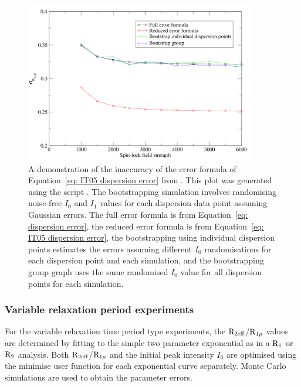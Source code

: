 \begin{figure}[h]
\label{fig: dispersion error comparison}
\centerline{\includegraphics[width=0.9\textwidth, bb=14 14 728 512]{graphics/analyses/dispersion/error_comparison}}
\caption[Comparison of relaxation dispersion errors]{A demonstration of the inaccuracy of the error formula of Equation~\ref{eq: IT05 dispersion error} from \citet{IshimaTorchia05}.  This plot was generated using the script .  The bootstrapping simulation involves randomising noise-free $I_0$ and $I_1$ values for each dispersion data point assuming Gaussian errors.  The full error formula is from Equation~\ref{eq: dispersion error}, the reduced error formula is from Equation~\ref{eq: IT05 dispersion error}, the bootstrapping using individual dispersion points estimates the errors assuming different $I_0$ randomisations for each dispersion point and each simulation, and the bootstrapping group graph uses the same randomised $I_0$ value for all dispersion points for each simulation.}
\end{figure}


\subsubsection{Variable relaxation period experiments}

For the variable relaxation time period type experiments, the $\mathrm{R}_{2\textrm{eff}}$/$\mathrm{R}_{1\rho}$ values are determined by fitting to the simple two parameter exponential as in a $\mathrm{R}_1$ or $\mathrm{R}_2$ analysis.  Both $\mathrm{R}_{2\textrm{eff}}$/$\mathrm{R}_{1\rho}$ and the initial peak intensity $I_0$ are optimised using the minimise user function for each exponential curve separately.  Monte Carlo simulations are used to obtain the parameter errors.



